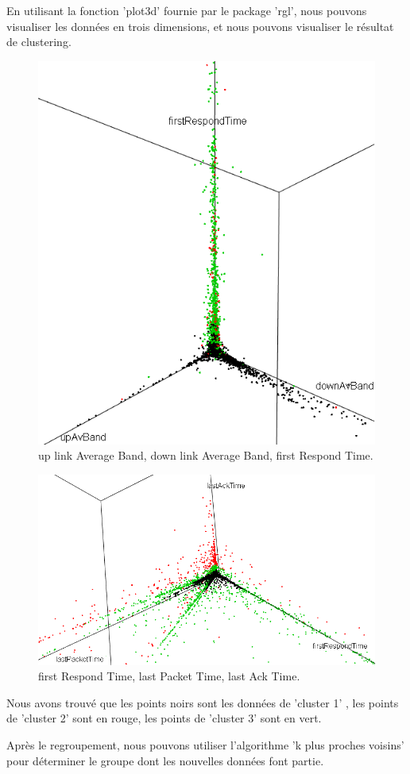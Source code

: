 En utilisant la fonction 'plot3d' fournie par le package 'rgl', nous pouvons visualiser les données en trois dimensions, et nous pouvons visualiser le résultat de clustering.


\begin{figure}[H]
\centering
\includegraphics[width=0.6\linewidth]{images/kmeqn}
\caption{up link Average Band, down link Average Band, first Respond Time.}
\label{fig:kmeqn}
\end{figure}
\begin{figure}[H]
\centering
\includegraphics[width=0.8\linewidth]{images/3delai}
\caption{first Respond Time, last Packet Time, last Ack Time.}
\label{fig:3delai}
\end{figure}

Nous avons trouvé que les points noirs sont les données de 'cluster 1' , les points de 'cluster 2' sont en rouge, les points de 'cluster 3' sont en vert. 

Après le regroupement, nous pouvons utiliser l'algorithme 'k plus proches voisins' pour déterminer le groupe dont les nouvelles données font partie.

